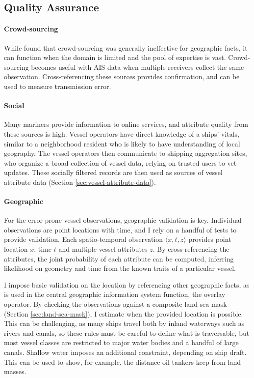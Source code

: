 \subsection{Quality Assurance}
\paragraph{Crowd-sourcing}
While \cite{goodchildli2012} found that crowd-sourcing was generally ineffective for geographic facts, it can function when the domain is limited and the pool of expertise is vast. Crowd-sourcing becomes useful with AIS data when multiple receivers collect the same observation. Cross-referencing these sources provides confirmation, and can be used to measure transmission error.

\paragraph{Social}
Many mariners provide information to online services, and attribute quality from these sources is high. Vessel operators have direct knowledge of a ships' vitals, similar to a neighborhood resident who is likely to have understanding of local geography. The vessel operators then communicate to shipping aggregation sites, who organize a broad collection of vessel data, relying on trusted users to vet updates. These socially filtered records are then used as sources of vessel attribute data (Section \ref{sec:vessel-attribute-data}).

\paragraph{Geographic}
For the error-prone vessel observations, geographic validation is key. Individual observations are point locations with time, and I rely on a handful of tests to provide validation. Each spatio-temporal observation $\langle x, t, z \rangle$ provides point location $x$, time $t$ and multiple vessel attributes $z$.  %
 By cross-referencing the attributes, the joint probability of each attribute can be computed, inferring likelihood on geometry and time from the known traits of a particular vessel.

I impose basic validation on the location by referencing other geographic facts, as is used in the central geographic information system function, the overlay operator. By checking the observations against a composite land-sea mask (Section \ref{sec:land-sea-mask}), I estimate when the provided location is possible. This can be challenging, as many ships travel both by inland waterways such as rivers and canals, so these rules must be careful to define what is traversable, but most vessel classes are restricted to major water bodies and a handful of large canals. Shallow water imposes an additional constraint, depending on ship draft. This can be used to show, for example, the distance oil tankers keep from land masses.

